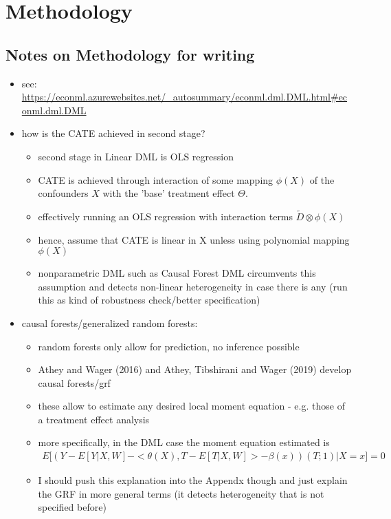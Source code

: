 \newpage
\section{Methodology} \label{sec:methodology}

\subsection{Notes on Methodology for writing}
\begin{itemize}
    \item see: \url{https://econml.azurewebsites.net/_autosummary/econml.dml.DML.html#econml.dml.DML}
    \item how is the CATE achieved in second stage?
    \begin{itemize}
        \item second stage in Linear DML is OLS regression 
        \item CATE is achieved through interaction of some mapping $\phi(X)$ of the confounders $X$ with the 'base' treatment effect $\Theta$.
        \item effectively running an OLS regression with interaction terms $\tilde{D} \otimes \phi(X)$ 
        \item hence, assume that CATE is linear in X unless using polynomial mapping $\phi(X)$ 
        \item nonparametric DML such as Causal Forest DML circumvents this assumption and detects non-linear heterogeneity in case there is any (run this as kind of robustness check/better specification)
    \end{itemize}
    \item causal forests/generalized random forests: 
    \begin{itemize}
        \item random forests only allow for prediction, no inference possible 
        \item Athey and Wager (2016) and Athey, Tibshirani and Wager (2019) develop causal forests/grf
        \item these allow to estimate any desired local moment equation - e.g. those of a treatment effect analysis 
        \item more specifically, in the DML case the moment equation estimated is 
        \begin{align*}
            E\big[\left(Y-E[Y|X, W] - <\theta(X), T-E[T|X, W]> - \beta(x)\right) (T; 1)|X=x\big]=0
        \end{align*}
        \item I should push this explanation into the Appendx though and just explain the GRF in more general terms (it detects heterogeneity that is not specified before)
    \end{itemize}
\end{itemize}
